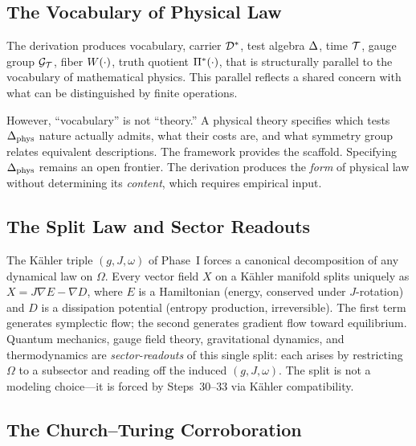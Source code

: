 \subsection{The Vocabulary of Physical Law}
\label{sec:discussion:physics}

The derivation produces vocabulary, carrier $\mathcal{D}^*$, test
algebra $\Delta$, time $\mathcal{T}$, gauge group $\mathcal{G}_{\mathcal{T}}$, fiber
$W(\cdot)$, truth quotient $\Pi^*(\cdot)$, that is
structurally parallel to the vocabulary of mathematical physics.
This parallel reflects a shared concern with what can be distinguished by
finite operations.

However, ``vocabulary'' is not ``theory.'' A physical theory
specifies which tests $\Delta_{\mathrm{phys}}$ nature actually
admits, what their costs are, and what symmetry group relates
equivalent descriptions. The \Opoch{} framework provides the
scaffold. Specifying $\Delta_{\mathrm{phys}}$ remains an open frontier.
The derivation produces the \emph{form} of physical law without
determining its \emph{content}, which requires empirical input.

\subsection{The Split Law and Sector Readouts}
\label{sec:discussion:split-law}

The K\"{a}hler triple $(g, J, \omega)$ of Phase~I forces a canonical
decomposition of any dynamical law on $\Omega$.  Every vector field $X$
on a K\"{a}hler manifold splits uniquely as
$X = J\nabla E - \nabla D$,
where $E$ is a Hamiltonian (energy, conserved under $J$-rotation) and $D$
is a dissipation potential (entropy production, irreversible).  The first
term generates symplectic flow; the second generates gradient flow toward
equilibrium.  Quantum mechanics, gauge field theory, gravitational
dynamics, and thermodynamics are \emph{sector-readouts} of this single
split: each arises by restricting $\Omega$ to a subsector and reading off
the induced $(g, J, \omega)$.  The split is not a modeling choice---it is
forced by Steps~30--33 via K\"{a}hler compatibility.

\subsection{The Church--Turing Corroboration}
\label{sec:discussion:utm}

